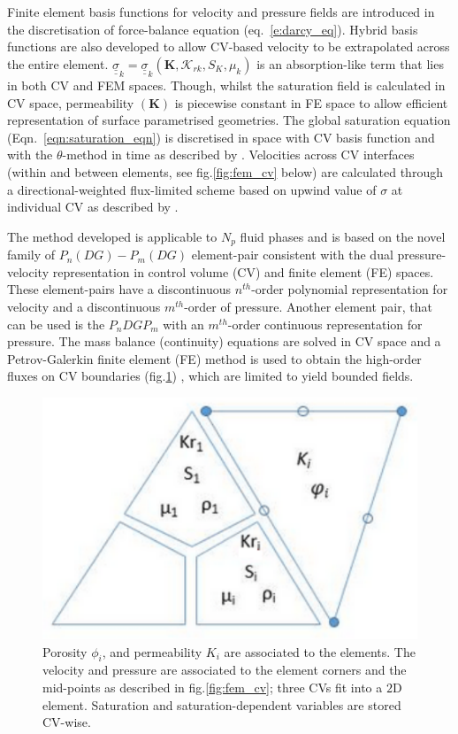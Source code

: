 \documentclass[preprint,authoryear,12pt]{elsarticle}
\begin{document}
\medskip
Finite element basis functions for velocity and pressure fields are introduced in the discretisation of force-balance equation (eq.~\ref{e:darcy_eq}). Hybrid basis functions are also developed to allow CV-based velocity to be extrapolated across the entire element. $\underline{\underline{\sigma}}_{k}=\underline{\underline{\sigma}}_{k}\left({\mathbf K}, \mathcal{K}_{rk}, S_{K}, \mu_{k}\right)$ is an absorption-like term that lies in both CV and FEM spaces. Though, whilst the saturation field is calculated in CV space, permeability $\left({\mathbf K}\right)$ is piecewise constant in FE space to allow efficient representation of surface parametrised geometries. The global saturation equation (Eqn.~\ref{eqn:saturation_eqn}) is discretised in space with CV basis function and with the $\theta$-method in time as described by \citet{gomes_book_2012}. Velocities across CV interfaces (within and between elements, see fig.\ref{fig:fem_cv} below) are calculated through a directional-weighted flux-limited scheme based on upwind value of $\sigma$ at individual CV as described by \citet{jackson_2013}.

 The method developed is applicable to $N_{p}$ fluid phases and is based on the novel family of $P_{n}(DG)-P_{m}(DG)$ element-pair consistent with the dual pressure-velocity representation in control volume (CV) and finite element (FE) spaces. These element-pairs have a discontinuous $n^{th}$-order polynomial representation for velocity and a discontinuous $m^{th}$-order of pressure. Another element pair, that can be used is the $P_{n}DGP_{m}$ with an $m^{th}$-order continuous representation for pressure. The mass balance (continuity) equations are solved in CV space and a Petrov-Galerkin finite element (FE) method is used to obtain the high-order fluxes on CV boundaries (fig.\ref{fig:fem_elem})  , which are limited to yield bounded fields.

\begin{figure}[h] 
\centering
\includegraphics[width=.5\textwidth]{./Pics/element_n.pdf}
\caption{Porosity $\phi_{i}$, and permeability $K_{i}$ are associated to the elements. The velocity and pressure are associated to the element corners and the mid-points as described in fig.\ref{fig:fem_cv}; three CVs fit into a $2$D element. Saturation and saturation-dependent variables are stored CV-wise.}
\label{fig:fem_elem}
\end{figure}
\end{document}
